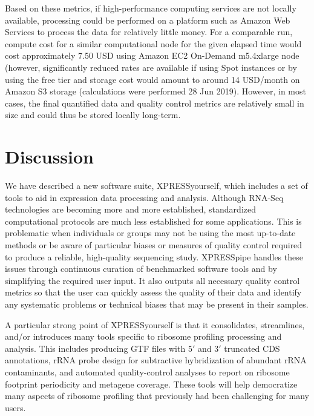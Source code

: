 \documentclass[10pt, oneside]{article}
\begin{document}
Based on these metrics, if high-performance computing services are not locally available, processing could be performed on a platform such as Amazon Web Services to process the data for relatively little money. For a comparable run, compute cost for a similar computational node for the given elapsed time would cost approximately 7.50 USD using Amazon EC2 On-Demand m5.4xlarge node (however, significantly reduced rates are available if using Spot instances or by using the free tier and storage cost would amount to around 14 USD/month on Amazon S3 storage (calculations were performed 28 Jun 2019). However, in most cases, the final quantified data and quality control metrics are relatively small in size and could thus be stored locally long-term. \par


\section{Discussion}
We have described a new software suite, XPRESSyourself, which includes a set of tools to aid in expression data processing and analysis. Although RNA-Seq technologies are becoming more and more established, standardized computational protocols are much less established for some applications. This is problematic when individuals or groups may not be using the most up-to-date methods or be aware of particular biases or measures of quality control required to produce a reliable, high-quality sequencing study. XPRESSpipe handles these issues through continuous curation of benchmarked software tools and by simplifying the required user input. It also outputs all necessary quality control metrics so that the user can quickly assess the quality of their data and identify any systematic problems or technical biases that may be present in their samples. \par

A particular strong point of XPRESSyourself is that it consolidates, streamlines, and/or introduces many tools specific to ribosome profiling processing and analysis. This includes producing GTF files with $5'$ and $3'$ truncated CDS annotations, rRNA probe design for subtractive hybridization of abundant rRNA contaminants, and automated quality-control analyses to report on ribosome footprint periodicity and metagene coverage. These tools will help democratize many aspects of ribosome profiling that previously had been challenging for many users. \par
\end{document}
